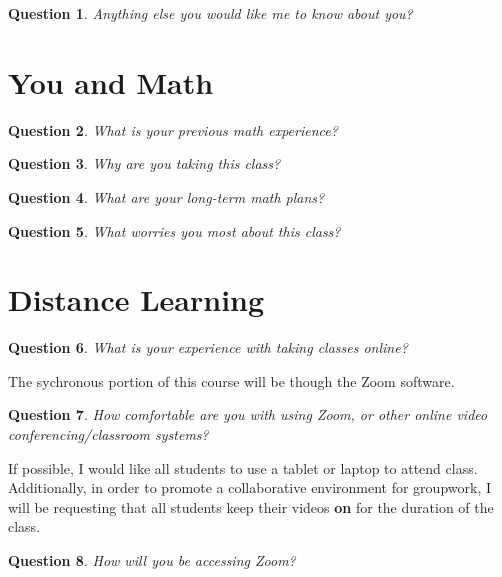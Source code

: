 \documentclass[11pt,reqno,final]{amsart}
\numberwithin{equation}{section}
\numberwithin{figure}{section}
\newtheorem{question}{Question}
\theoremstyle{definition} %
\begin{document}
\begin{question}
        Anything else you would like me to know about you? \\ $ $\\
\end{question}

\section{You and Math}

\begin{question}
        What is your previous math experience? \vfill
\end{question}

\begin{question}
        Why are you taking this class? \vfill
\end{question}

\begin{question}
        What are your long-term math plans? \vfill
\end{question}

\begin{question}
        What worries you most about this class? \vfill
\end{question}

\newpage

\section{Distance Learning}

\begin{question}
        What is your experience with taking classes online?
        \vfill        
\end{question}

The sychronous portion of this course will be though the Zoom software.
\begin{question}
        How comfortable are you with using Zoom, or other online video conferencing/classroom systems?
        \vfill
\end{question}

If possible, I would like all students to use a tablet or laptop to attend class.
Additionally, in order to promote a collaborative environment for groupwork, I will be requesting that all students keep their videos \textbf{on} for the duration of the class.
\begin{question}
        How will you be accessing Zoom? \\ $ $\\
\end{question}
\end{document}

